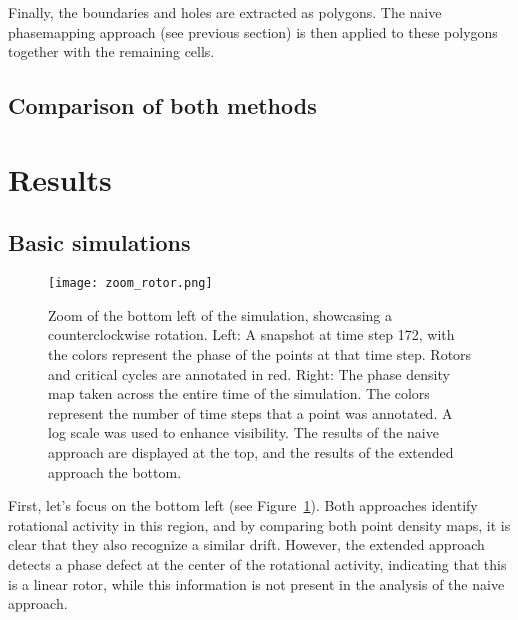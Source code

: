 \documentclass[twocolumn]{article}
\begin{document}
Finally, the boundaries and holes are extracted as polygons. The naive
phasemapping approach (see previous section) is then applied to these
polygons together with the remaining cells.

\subsection{Comparison of both methods}

\section{Results}

\subsection{Basic simulations}

\begin{figure}[ht]
  \centering
  \texttt{[image: zoom\_rotor.png]}
  \caption{Zoom of the bottom left of the simulation, showcasing a
    counterclockwise rotation. Left: A snapshot at time step 172, with the
    colors represent the phase of the points at that time step. Rotors and
    critical cycles are annotated in red. Right: The phase density map taken
    across the entire time of the simulation. The colors represent the
    number of time steps that a point was annotated. A log scale was used to
    enhance visibility. The results of the naive approach are displayed at
  the top, and the results of the extended approach the bottom.}
  \label{fig:zoom-rotor}
\end{figure}

First, let's focus on the bottom left (see Figure~\ref{fig:zoom-rotor}).
Both approaches identify rotational activity in this region, and by
comparing both point density maps, it is clear that they also recognize
a similar drift. However, the extended approach detects a phase defect
at the center of the rotational activity, indicating that this is a
linear rotor, while this information is not present in the analysis of
the naive approach.
\end{document}
